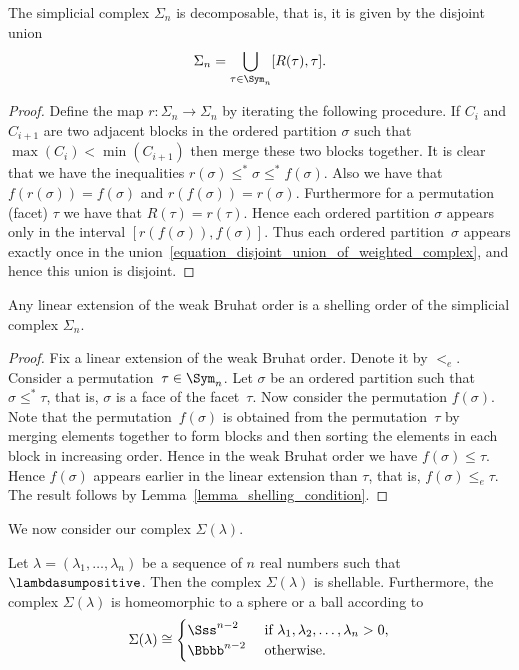 \begin{prop}[Bj\"orner]
The simplicial complex $\Sigma_{n}$
is decomposable, that is, it is
given by the disjoint union
\begin{equation}
     \Sigma_{n} = \bigcup_{\tau \in \Sym_{n}} [R(\tau), \tau] .
\label{equation_disjoint_union_of_weighted_complex}
\end{equation}
\label{proposition_Sigma_decomposition}
\end{prop}
\begin{proof}
Define the map $r : \Sigma_{n} \longrightarrow \Sigma_{n}$
by iterating the following procedure.
If $C_{i}$ and $C_{i+1}$ are two adjacent blocks in the ordered partition $\sigma$
such that $\max(C_{i}) < \min(C_{i+1})$ then
merge these two blocks together.
It is clear that we have the inequalities
$r(\sigma) \leq^{*} \sigma \leq^{*} f(\sigma)$.
Also we have that $f(r(\sigma)) = f(\sigma)$
and $r(f(\sigma)) = r(\sigma)$.
Furthermore for a permutation (facet) $\tau$ we have that
$R(\tau) = r(\tau)$.
Hence each ordered partition
$\sigma$ appears only in the interval $[r(f(\sigma)), f(\sigma)]$.
Thus each ordered partition~$\sigma$ appears
exactly once 
in the union~\eqref{equation_disjoint_union_of_weighted_complex},
and hence this union is disjoint.
\end{proof}


\begin{theorem}[Bj\"orner]
Any linear extension of the weak Bruhat order is
a shelling order of the simplicial complex $\Sigma_{n}$.
\label{theorem_linear_extension_of_Bruhat_order}
\end{theorem}
\begin{proof}
Fix a linear extension of the weak Bruhat order.
Denote it by $<_{e}$.
Consider a permutation~$\tau \in \Sym_{n}$.
Let $\sigma$ be an ordered partition
such that $\sigma \leq^{*} \tau$,
that is, $\sigma$ is a face of the facet~$\tau$.
Now consider the permutation $f(\sigma)$.
Note that the permutation~$f(\sigma)$ is obtained from
the permutation~$\tau$ by merging elements together
to form blocks
and then sorting the elements in each block in increasing order.
Hence in the weak Bruhat order we have
$f(\sigma) \leq \tau$.
Hence $f(\sigma)$ appears earlier in the linear extension than $\tau$,
that is, $f(\sigma) \leq_{e} \tau$.
The result follows by
Lemma~\ref{lemma_shelling_condition}.
\end{proof}


We now consider our complex $\Sigma(\lambda)$.
\begin{theorem}
Let $\lambda = (\lambda_{1}, \ldots, \lambda_{n})$ be a sequence of
$n$ real numbers
such that $\lambdasumpositive$.
Then the complex $\Sigma(\lambda)$ is shellable.
Furthermore,
the complex $\Sigma(\lambda)$ is homeomorphic to a sphere or a ball
according to
$$
\Sigma(\lambda)
\cong
\begin{cases}
\Sss^{n-2} & \text{ if } \lambda_{1}, \lambda_{2}, \ldots, \lambda_{n} > 0, \\
\Bbbb^{n-2} & \text{ otherwise. }
\end{cases}
$$
\label{theorem_lots_of_shellings}
\end{theorem}

